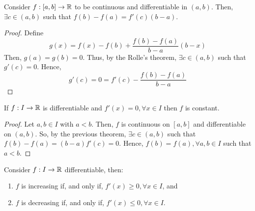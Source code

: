 \begin{theorem}
    Consider $f: [a,b] \to \mathbb{R}$ to be continuous and differentiable in $(a,b)$. Then, $\exists c \in (a,b)$ such that $f(b) - f(a) = f'(c)(b - a)$.
\end{theorem}

\begin{proof}
    Define
    \begin{equation*}
        g(x) = f(x) - f(b) + \frac{f(b) - f(a)}{b - a}(b - x)
    \end{equation*}
    Then, $g(a) = g(b) = 0$. Thus, by the Rolle's theorem, $\exists c \in (a,b)$ such that $g'(c) = 0$. Hence,
    \begin{equation*}
        g'(c) = 0 = f'(c) - \frac{f(b) - f(a)}{b-a}
    \end{equation*}
\end{proof}

\begin{theorem}
    If $f: I \to \mathbb{R}$ is differentiable and $f'(x) = 0, \forall x \in I$ then $f$ is constant.
\end{theorem}

\begin{proof}
    Let $a,b \in I$ with $a < b$. Then, $f$ is continuous on $[a,b]$ and differentiable on $(a,b)$. So, by the previous theorem, $\exists c \in (a,b)$ such that $f(b) - f(a) = (b-a)f'(c) = 0$. Hence, $f(b) = f(a), \forall a, b \in I$ such that $a < b$.
\end{proof}

\begin{theorem}
    Consider $f: I \to \mathbb{R}$ differentiable, then:
    \begin{enumerate}
        \item $f$ is increasing if, and only if, $f'(x) \geq 0, \forall x \in I$, and
        \item $f$ is decreasing if, and only if, $f'(x) \leq 0, \forall x \in I$.
    \end{enumerate}
\end{theorem}

